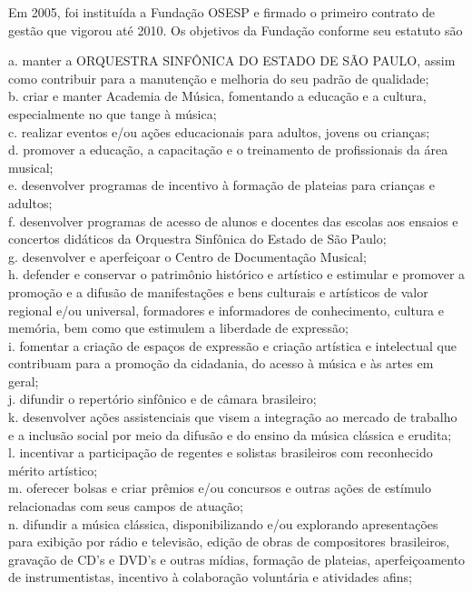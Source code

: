 \documentclass[a4paper, 12pt, openright, oneside, german, french, english, brazil]{abntex2}
\begin{document}
	Em 2005, foi instituída a Fundação OSESP e firmado o primeiro contrato de gestão que vigorou até 2010.
	Os objetivos da Fundação conforme seu estatuto são
	
	\begin{citacao}
		a. manter a ORQUESTRA SINFÔNICA DO ESTADO DE SÃO PAULO, assim como contribuir para a manutenção e melhoria do seu padrão de qualidade;\\
		b. criar e manter Academia de Música, fomentando a educação e a cultura, especialmente no que tange à música;\\
		c. realizar eventos e/ou ações educacionais para adultos, jovens ou crianças;\\
		d. promover a educação, a capacitação e o treinamento de profissionais da área musical;\\
		e. desenvolver programas de incentivo à formação de plateias para crianças e adultos;\\
		f. desenvolver programas de acesso de alunos e docentes das escolas aos ensaios e concertos didáticos da Orquestra Sinfônica do Estado de São Paulo;\\
		g. desenvolver e aperfeiçoar o Centro de Documentação Musical;\\
		h. defender e conservar o patrimônio histórico e artístico e estimular e promover a promoção e a difusão de manifestações e bens culturais e artísticos de valor regional e/ou universal, formadores e informadores de conhecimento, cultura e memória, bem como que estimulem a liberdade de expressão;\\
		i. fomentar a criação de espaços de expressão e criação artística e intelectual que contribuam para a promoção da cidadania, do acesso à música e às artes em geral;\\
		j. difundir o repertório sinfônico e de câmara brasileiro;\\
		k. desenvolver ações assistenciais que visem a integração ao mercado de trabalho e a inclusão social por meio da difusão e do ensino da música clássica e erudita;\\
		l. incentivar a participação de regentes e solistas brasileiros com reconhecido mérito artístico;\\
		m. oferecer bolsas e criar prêmios e/ou concursos e outras ações de estímulo relacionadas com seus campos de atuação;\\
		n. difundir a música clássica, disponibilizando e/ou explorando apresentações para exibição por rádio e televisão, edição de obras de compositores brasileiros, gravação de CD's e DVD's e outras mídias, formação de plateias, aperfeiçoamento de instrumentistas, incentivo à colaboração voluntária e atividades afins;\\

\end{citacao}
\end{document}
